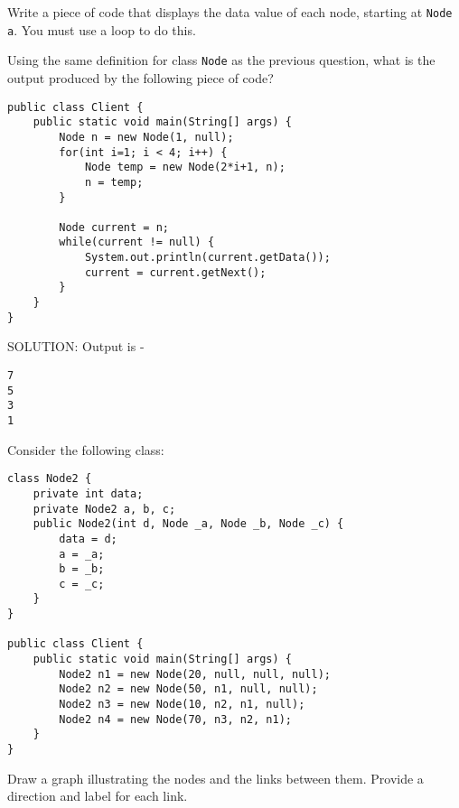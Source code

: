 \begin{questions}
\else
\fi

Write a piece of code that displays the data value of each node, starting at \texttt{Node a}. You must use a loop to do this.

\question Using the same definition for class \texttt{Node} as the previous question, what is the output produced by the following piece of code? 

\begin{lstlisting}
public class Client {
	public static void main(String[] args) {
		Node n = new Node(1, null);
		for(int i=1; i < 4; i++) {
			Node temp = new Node(2*i+1, n);	
			n = temp;
		}
		
		Node current = n;
		while(current != null) {
			System.out.println(current.getData());
			current = current.getNext();
		}
	}
}
\end{lstlisting}

\ifprintanswers
\newpage
SOLUTION: Output is -
\begin{lstlisting}
7
5
3
1
\end{lstlisting}
\else
\newpage
\fi

\question Consider the following class:

\begin{lstlisting}
class Node2 {
	private int data;
	private Node2 a, b, c;
	public Node2(int d, Node _a, Node _b, Node _c) {
		data = d;
		a = _a;
		b = _b;
		c = _c;
	}
}

public class Client {
	public static void main(String[] args) {
		Node2 n1 = new Node(20, null, null, null);
		Node2 n2 = new Node(50, n1, null, null);
		Node2 n3 = new Node(10, n2, n1, null);
		Node2 n4 = new Node(70, n3, n2, n1);
	}
}
\end{lstlisting}

Draw a graph illustrating the nodes and the links between them. Provide a direction and label for each link.

\ifprintanswers
{}
\else
\fi


\end{questions}
